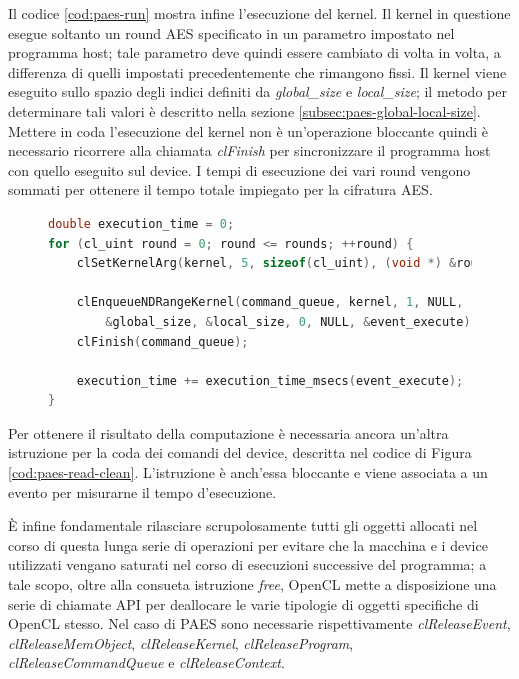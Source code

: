 \documentclass[12pt,a4paper,oneside]{book}
\begin{document}
Il codice \ref{cod:paes-run} mostra infine l'esecuzione del kernel. Il kernel in questione esegue soltanto un round \ac{AES} specificato in un parametro impostato nel programma host; tale parametro deve quindi essere cambiato di volta in volta, a differenza di quelli impostati precedentemente che rimangono fissi. Il kernel viene eseguito sullo spazio degli indici definiti da \textit{global\_size} e \textit{local\_size}; il metodo per determinare tali valori è descritto nella sezione \ref{subsec:paes-global-local-size}. Mettere in coda l'esecuzione del kernel non è un'operazione bloccante quindi è necessario ricorrere alla chiamata \textit{clFinish} per sincronizzare il programma host con quello eseguito sul device. I tempi di esecuzione dei vari round vengono sommati per ottenere il tempo totale impiegato per la cifratura \ac{AES}.

\begin{figure}
\begin{lstlisting}[caption={\textit{Esecuzione del kernel.}},label={cod:paes-run},language=C]
double execution_time = 0;
for (cl_uint round = 0; round <= rounds; ++round) {
	clSetKernelArg(kernel, 5, sizeof(cl_uint), (void *) &round);		
	
	clEnqueueNDRangeKernel(command_queue, kernel, 1, NULL, 
		&global_size, &local_size, 0, NULL, &event_execute);
	clFinish(command_queue);
	
	execution_time += execution_time_msecs(event_execute);
}
\end{lstlisting}
\end{figure}

Per ottenere il risultato della computazione è necessaria ancora un'altra istruzione per la coda dei comandi del device, descritta nel codice di Figura \ref{cod:paes-read-clean}. L'istruzione è anch'essa bloccante e viene associata a un evento per misurarne il tempo d'esecuzione.

È infine fondamentale rilasciare scrupolosamente tutti gli oggetti allocati nel corso di questa lunga serie di operazioni per evitare che la macchina e i device utilizzati vengano saturati nel corso di esecuzioni successive del programma; a tale scopo, oltre alla consueta istruzione \textit{free}, \ac{OpenCL} mette a disposizione una serie di chiamate \ac{API} per deallocare le varie tipologie di oggetti specifiche di \ac{OpenCL} stesso. Nel caso di PAES sono necessarie rispettivamente \textit{clReleaseEvent}, \textit{clReleaseMemObject}, \textit{clReleaseKernel}, \textit{clReleaseProgram}, \textit{clReleaseCommandQueue} e \textit{clReleaseContext}.
\end{document}
